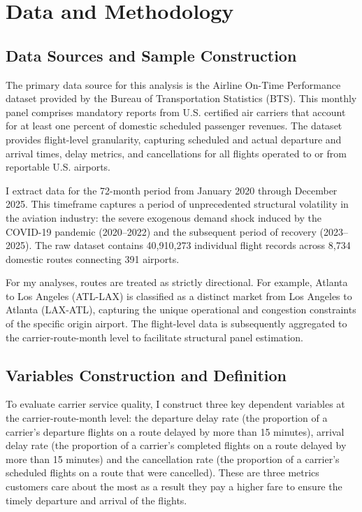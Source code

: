 \documentclass[preprint,12pt,authoryear]{elsarticle}
\begin{document}
\section{Data and Methodology}
\label{sec:methodology}

\subsection{Data Sources and Sample Construction}
The primary data source for this analysis is the Airline On-Time Performance dataset provided by the Bureau of Transportation Statistics (BTS). This monthly panel comprises mandatory reports from U.S. certified air carriers that account for at least one percent of domestic scheduled passenger revenues. The dataset provides flight-level granularity, capturing scheduled and actual departure and arrival times, delay metrics, and cancellations for all flights operated to or from reportable U.S. airports.

I extract data for the 72-month period from January 2020 through December 2025. This timeframe captures a period of unprecedented structural volatility in the aviation industry: the severe exogenous demand shock induced by the COVID-19 pandemic (2020–2022) and the subsequent period of recovery (2023–2025). The raw dataset contains 40,910,273 individual flight records across 8,734 domestic routes connecting 391 airports.

For my analyses, routes are treated as strictly directional. For example, Atlanta to Los Angeles (ATL-LAX) is classified as a distinct market from Los Angeles to Atlanta (LAX-ATL), capturing the unique operational and congestion constraints of the specific origin airport. The flight-level data is subsequently aggregated to the carrier-route-month level to facilitate structural panel estimation.

\subsection{Variables Construction and Definition}

To evaluate carrier service quality, I construct three key dependent variables at the carrier-route-month level: the departure delay rate (the proportion of a carrier's departure flights on a route delayed by more than 15 minutes), arrival delay rate (the proportion of a carrier's completed flights on a route delayed by more than 15 minutes)  and the cancellation rate (the proportion of a carrier's scheduled flights on a route that were cancelled). These are three metrics customers care about the most as a result they pay a higher fare to ensure the timely departure and arrival of the flights.
\end{document}
